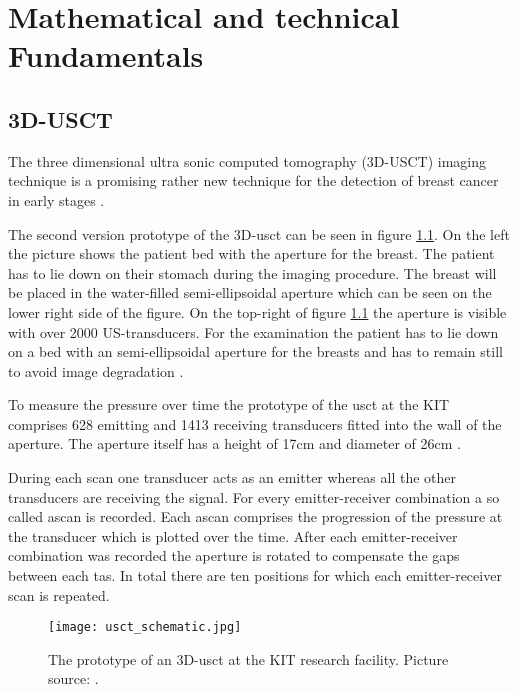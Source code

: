 \chapter{Mathematical and technical Fundamentals}
\label{chap:mathFund}


\section{3D-USCT}

The three dimensional ultra sonic computed tomography (3D-USCT) imaging technique is a promising rather new technique for the detection of breast cancer in early stages \cite{Ruiter2011RealizationUSCT}.

The second version prototype of the 3D-\ac{usct} can be seen in figure \ref{usct_example}. On the left the picture shows the patient bed with the aperture for the breast. The patient has to lie down on their stomach during the imaging procedure. The breast will be placed in the water-filled semi-ellipsoidal aperture which can be seen on the lower right side of the figure. On the top-right of figure \ref{usct_example} the aperture is visible with over 2000 US-transducers.
For the examination the patient has to lie down on a bed with an semi-ellipsoidal aperture for the breasts and has to remain still to avoid image degradation \cite{Ruiter2011RealizationUSCT}. 

To measure the pressure over time the prototype of the \ac{usct} at the KIT comprises 628 emitting and 1413 receiving transducers fitted into the wall of the aperture. The aperture itself has a height of 17cm and diameter of 26cm \cite{Kretzek2014GPUAberration}.

During each scan one transducer acts as an emitter whereas all the other transducers are receiving the signal. For every emitter-receiver combination a so called \ac{ascan} is recorded. Each \ac{ascan} comprises the progression of the pressure at the transducer which is plotted over the time. After each emitter-receiver combination was recorded the aperture is rotated to compensate the gaps between each \ac{tas}. In total there are ten positions for which each emitter-receiver scan is repeated.
 


\begin{figure}[H]
    \centering
    \texttt{[image: usct\_schematic.jpg]}
    \caption{The prototype of an 3D-\ac{usct} at the KIT research facility. Picture source: \cite{Kretzek2014GPUAberration}. }
    \label{usct_example}
\end{figure}


